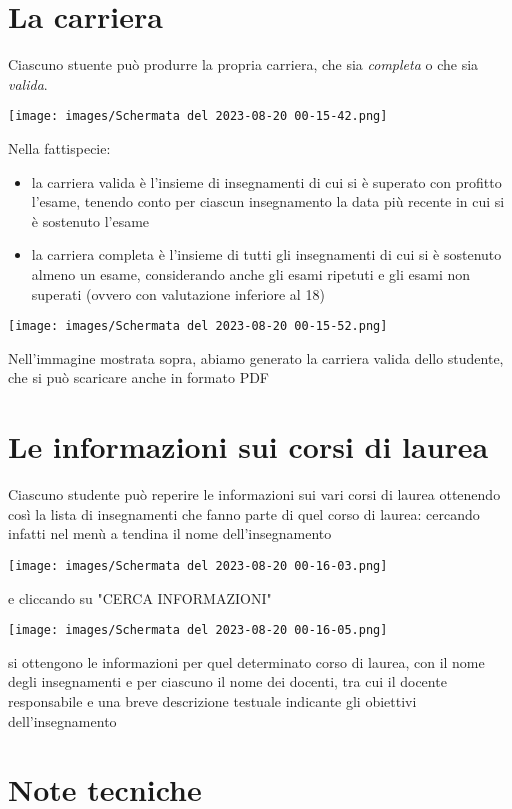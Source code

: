 \documentclass{article}
\begin{document}
    \section{La carriera}
    Ciascuno stuente può produrre la propria carriera, che sia \textit{completa} o che sia \textit{valida}.

    \texttt{[image: images/Schermata del 2023-08-20 00-15-42.png]}

    Nella fattispecie:
    \begin{itemize}
        \item la carriera valida è l'insieme di insegnamenti di cui si è superato con profitto l'esame, tenendo conto per ciascun insegnamento la data più recente in cui si è sostenuto l'esame
        \item  la carriera completa è l'insieme di tutti gli insegnamenti di cui si è sostenuto almeno un esame, considerando anche gli esami ripetuti e gli esami non superati (ovvero con valutazione inferiore al 18)
    \end{itemize}

    \texttt{[image: images/Schermata del 2023-08-20 00-15-52.png]}

    Nell'immagine mostrata sopra, abiamo generato la carriera valida dello studente, che si può scaricare anche in formato PDF

    \section{Le informazioni sui corsi di laurea}
    Ciascuno studente può reperire le informazioni sui vari corsi di laurea ottenendo così la lista di insegnamenti che fanno parte di quel corso di laurea: cercando infatti nel menù a tendina il nome dell'insegnamento

    \texttt{[image: images/Schermata del 2023-08-20 00-16-03.png]}

    e cliccando su "CERCA INFORMAZIONI"

    \texttt{[image: images/Schermata del 2023-08-20 00-16-05.png]}

    si ottengono le informazioni per quel determinato corso di laurea, con il nome degli insegnamenti e per ciascuno il nome dei docenti, tra cui il docente responsabile e una breve descrizione testuale indicante gli obiettivi dell'insegnamento

    \section{Note tecniche}
\end{document}
